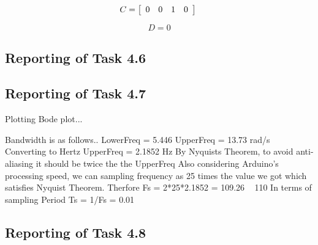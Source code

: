 \documentclass[11pt]{article}
\begin{document}
\begin{par}
$$C=\left\lbrack \begin{array}{cccc}\linebreak 
0 & 0 & 1 & 0\linebreak 
\end{array}\right\rbrack \;$$
\end{par}

\begin{par}
$$D=0$$
\end{par}






\subsection*{Reporting of Task 4.6}






\subsection*{Reporting of Task 4.7}


Plotting Bode plot...


Bandwidth is as follows..
\newline
LowerFreq = 5.446
\newline
UpperFreq = 13.73 rad/s
\newline
Converting to Hertz  
\newline
UpperFreq = 2.1852 Hz
\newline
By Nyquists Theorem, to avoid anti-aliasing it should be twice the the UpperFreq
Also considering Arduino's processing speed, we can sampling frequency as 25 times the value we got which satisfies Nyquist Theorem.
Therfore
Fs =   2*25*2.1852 = 109.26 ~ 110
In terms of sampling Period
Ts = 1/Fs = 0.01






\subsection*{Reporting of Task 4.8}
\end{document}
